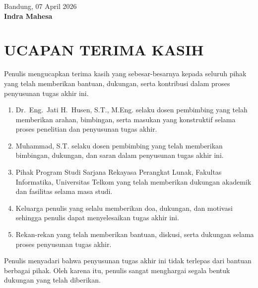 \vspace{1cm}

\begin{flushright}
  Bandung, 07 April 2026 \\[1cm]
  \textbf{Indra Mahesa}
\end{flushright}

\chapter*{UCAPAN TERIMA KASIH}

Penulis mengucapkan terima kasih yang sebesar-besarnya kepada seluruh pihak yang telah memberikan
bantuan, dukungan, serta kontribusi dalam proses penyusunan tugas akhir ini.

\begin{enumerate}
  \item Dr.~Eng.~Jati H.~Husen, S.T., M.Eng. selaku dosen pembimbing yang telah memberikan
    arahan, bimbingan, serta masukan yang konstruktif selama proses penelitian dan penyusunan
    tugas akhir.
  \item Muhammad, S.T. selaku dosen pembimbing yang telah memberikan bimbingan, dukungan, dan
    saran dalam penyusunan tugas akhir ini.
  \item Pihak Program Studi Sarjana Rekayasa Perangkat Lunak, Fakultas Informatika, Universitas
    Telkom yang telah memberikan dukungan akademik dan fasilitas selama masa studi.
  \item Keluarga penulis yang selalu memberikan doa, dukungan, dan motivasi sehingga penulis
    dapat menyelesaikan tugas akhir ini.
  \item Rekan-rekan yang telah memberikan bantuan, diskusi, serta dukungan selama proses
    penyusunan tugas akhir.
\end{enumerate}

Penulis menyadari bahwa penyusunan tugas akhir ini tidak terlepas dari bantuan berbagai pihak.
Oleh karena itu, penulis sangat menghargai segala bentuk dukungan yang telah diberikan.
